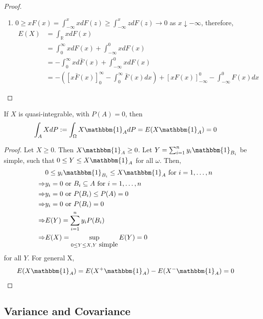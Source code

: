 \documentclass{article}
\newcommand{\R}{\mathbb{R}}
\begin{document}
\begin{myprop}{}{}
\begin{proof}
\begin{enumerate}
\begin{enumerate}[label=(\roman*)]
\begin{enumerate}[label=(\alph*)]
							\item $0\geq xF(x)=\int_{-\infty}^xxdF(z)\geq\int_{-\infty}^xzdF(z)\to0$ as $x\downarrow-\infty$, therefore,
							\begin{align*}
								E(X)&=\int_{\R}xdF(x)\\
								&=\int_0^{\infty}xdF(x)+\int_{-\infty}^0xdF(x)\\
								&=-\int_0^{\infty}xd\bar{F}(x)+\int_{-\infty}^0xdF(x)\\
								&=-([x\bar{F}(x)]_0^{\infty}-\int_0^{\infty}\bar{F}(x)dx)+[xF(x)]_{-\infty}^0-\int_{-\infty}^0F(x)dx
							\end{align*}
						\end{enumerate}
					\end{enumerate}
				\end{enumerate}
			\end{proof}
		\end{myprop}
		
		\begin{myprop}{}{}
			If $X$ is quasi-integrable, with $P(A)=0$, then $$\int_AXdP:=\int_{\Omega}X\mathbbm{1}_AdP=E(X\mathbbm{1}_A)=0$$
			
			\begin{proof}
				Let $X\geq0$. Then $X\mathbbm{1}_A\geq0$. Let $Y=\sum_{i=1}^{n}y_i\mathbbm{1}_{B_i}$ be simple, such that $0\leq Y\leq X\mathbbm{1}_A$ for all $\omega$. Then,
				\begin{align*}
					&0\leq y_i\mathbbm{1}_{B_i}\leq X\mathbbm{1}_A\mbox{ for }i=1, \dots, n\\
					\Rightarrow&y_i=0\mbox{ or }B_i\subseteq A\mbox{ for }i=1, \dots, n\\
					\Rightarrow&y_i=0\mbox{ or }P(B_i)\leq P(A)=0\\
					\Rightarrow&y_i=0\mbox{ or }P(B_i)=0\\
					\Rightarrow&E(Y)=\sum_{i=1}^{n}y_iP(B_i)\\
					\Rightarrow&E(X)=\sup_{0\leq Y\leq X, Y\mbox{ simple}}E(Y)=0
				\end{align*}
				for all $Y$. For general X, $$E(X\mathbbm{1}_A)=E(X^+\mathbbm{1}_A)-E(X^-\mathbbm{1}_A)=0$$
			\end{proof}
		\end{myprop}
		
		\subsection{Variance and Covariance}
		
\end{document}
